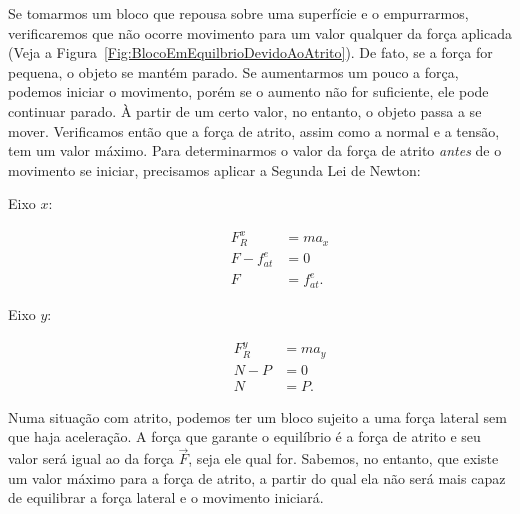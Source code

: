Se tomarmos um bloco que repousa sobre uma superfície e o empurrarmos, verificaremos que não ocorre movimento para um valor qualquer da força aplicada (Veja a Figura~\ref{Fig:BlocoEmEquilbrioDevidoAoAtrito}). De fato, se a força for pequena, o objeto se mantém parado. Se aumentarmos um pouco a força, podemos iniciar o movimento, porém se o aumento não for suficiente, ele pode continuar parado. À partir de um certo valor, no entanto, o objeto passa a se mover. Verificamos então que a força de atrito, assim como a normal e a tensão, tem um valor máximo. Para determinarmos o valor da força de atrito \emph{antes} de o movimento se iniciar, precisamos aplicar a Segunda Lei de Newton:
\begin{description}
    \item[Eixo $x$:]
        \begin{align}
            F_R^x &= m a_x \\
            F - f_{at}^e &= 0 \\
            F &= f_{at}^e.
        \end{align}
    \item[Eixo $y$:]
        \begin{align}
            F_R^y &= m a_y \\
            N - P &= 0 \\
            N &= P.
        \end{align}
\end{description}

\begin{marginfigure}
\centering
{}
\caption{Numa situação com atrito, podemos ter um bloco sujeito a uma força lateral sem que haja aceleração. A força que garante o equilíbrio é a força de atrito e seu valor será igual ao da força $\vec{F}$, seja ele qual for. Sabemos, no entanto, que existe um valor máximo para a força de atrito, a partir do qual ela não será mais capaz de equilibrar a força lateral e o movimento iniciará.\label{Fig:BlocoEmEquilbrioDevidoAoAtrito}}
\end{marginfigure}

